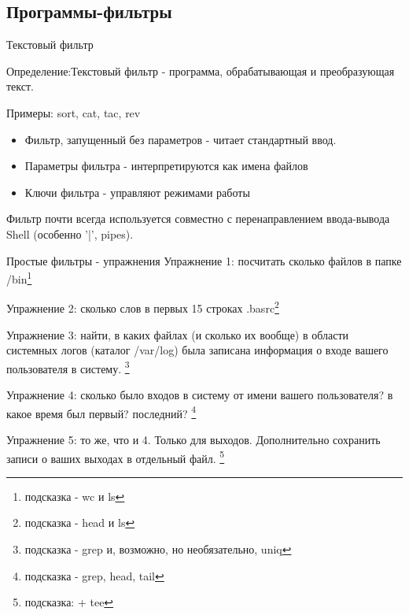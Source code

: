 \subsection{Программы-фильтры}

\begin{frame}{Текстовый фильтр}

  Определение:\newline \alert{Текстовый фильтр} - программа, обрабатывающая и преобразующая текст. \newline

  Примеры: \alert{sort}, \alert{cat}, \alert{tac}, \alert{rev} \pause
  \begin{itemize}
    \item Фильтр, запущенный без параметров - читает стандартный ввод. 
    \item Параметры фильтра - интерпретируются как имена файлов
    \item Ключи фильтра - управляют режимами работы
  \end{itemize} \pause

  Фильтр почти всегда используется совместно с перенаправлением ввода-вывода Shell (особенно '|', pipes).

\end{frame}



\begin{frame}{Простые фильтры - упражнения}
  \alert{Упражнение 1}: посчитать сколько файлов в папке /bin\footnote{подсказка - \alert{wc} и \alert{ls}}

  \alert{Упражнение 2}: сколько слов в первых 15 строках .basrc\footnote{подсказка - \alert{head} и \alert{ls}}

  \alert{Упражнение 3}: найти, в каких файлах (и сколько их вообще) в области системных логов (каталог \alert{/var/log}) была записана информация о входе вашего пользователя в систему. \footnote{подсказка - \alert{grep} и, возможно, но необязательно, \alert{uniq}}

  \alert{Упражнение 4}: сколько было входов в систему от имени вашего пользователя? в какое время был первый? последний? \footnote{подсказка - \alert{grep}, \alert{head}, \alert{tail}}

  \alert{Упражнение 5}: то же, что и 4. Только для выходов. Дополнительно сохранить записи о ваших выходах в отдельный файл. \footnote{подсказка: + \alert{tee}}

\end{frame}

